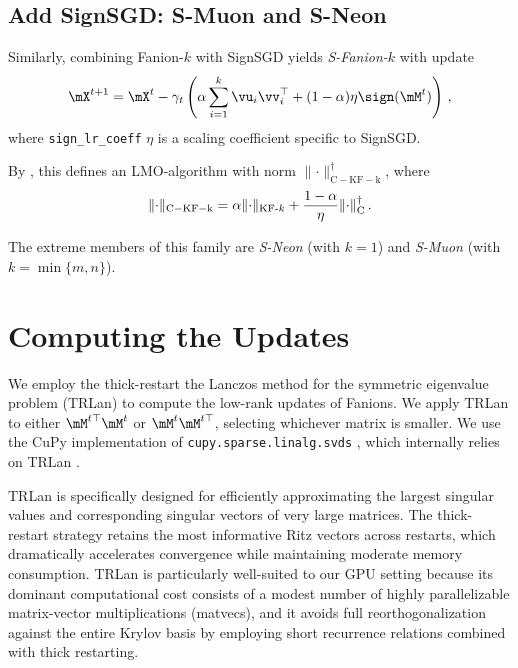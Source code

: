 \documentclass[pmlr]{jmlr}%
\newcommand{\norm}[1]{\lVert #1\rVert}
\DeclarePairedDelimiter{\normc}{\|}{\|_{\mathrm{C}}}
\DeclarePairedDelimiter{\normkfk}{\|}{\|_{\text{KF-}k}}
\begin{document}
 \subsection{Add SignSGD: S-Muon and S-Neon}
 
 Similarly, combining Fanion-$k$ with SignSGD yields \emph{S-Fanion-$k$} with update
 \begin{equation}\label{eq:sign_muon_update}
     \mX^{t+1} = \mX^{t} - \gamma_t \left(\alpha \sum_{i = 1}^k \vu_i \vv_i^\top + (1-\alpha)\eta\sign(\mM^t)\right)\,,
 \end{equation}
 where \texttt{sign\_lr\_coeff} $\eta$ is a scaling coefficient specific to SignSGD.
 
 By , this defines an LMO-algorithm with norm $\norm{\cdot}_{\mathrm{C-KF-k}}^\dagger$, where
 \begin{equation}\label{eq:ckfk_norm}
   \norm{\cdot}_{\mathrm{C-KF-k}} = \alpha \normkfk{\cdot} + \frac{1-\alpha}{\eta}\normc{\cdot}^\dagger\,.
 \end{equation}
 
 The extreme members of this family are \emph{S-Neon} (with $k = 1$) and \emph{S-Muon} (with $k = \min\{m, n\}$).
 
 \section{Computing the Updates}\label{sec:matrix-side}
 We employ the thick-restart the Lanczos method for the symmetric eigenvalue problem (TRLan) to compute the low-rank updates of Fanions. We apply TRLan to either $\mM^{t\top}\mM^t$ or $\mM^t \mM^{t\top}$, selecting whichever matrix is smaller. We use the CuPy implementation of \texttt{cupy.sparse.linalg.svds} \citep{cupy_svds_ref}, which internally relies on TRLan \citep{simonz1998thick}.
 
 TRLan is specifically designed for efficiently approximating the largest singular values and corresponding singular vectors of very large matrices. The thick-restart strategy retains the most informative Ritz vectors across restarts, which dramatically accelerates convergence while maintaining moderate memory consumption. TRLan is particularly well-suited to our GPU setting because its dominant computational cost consists of a modest number of highly parallelizable matrix-vector multiplications (matvecs), and it avoids full reorthogonalization against the entire Krylov basis by employing short recurrence relations combined with thick restarting.
 
\end{document}
